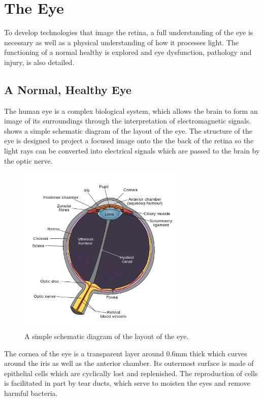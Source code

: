 
\chapter{The Eye}

\label{anatomy}

To develop technologies that image the retina, a full understanding
of the eye is necessary as well as a physical understanding of how it
processes light. The functioning of a normal healthy is explored and eye
dysfunction, pathology and injury, is also detailed.

\section{A Normal, Healthy Eye}

The human eye is a complex biological system, which allows the brain to
form an image of its surroundings through the interpretation of
electromagnetic signals.  shows a simple schematic
diagram of the layout of the eye. The structure of the eye is designed to
project a focused image onto the the back of the retina so the light rays
can be converted into electrical signals which are passed to the brain by
the optic nerve.

\begin{figure}[H]
\centering
  \includegraphics[width=8cm]{figures/schematic_diagram_of_the_human_eye}
\caption{A simple schematic diagram of the layout of the eye.\cite{wikiRhcastilhos}}
\label{fig:eye_simple}
\end{figure}

The cornea of the eye is a transparent layer around 0.6mm thick
which curves around the iris as well as the anterior
chamber.\cite{yaylali1997corneal,thoft1983x,patel1994refractive}
Its outermost surface is made of epithelial cells which are cyclically lost
and replenished.\cite{jester1999cellular,hassell2010molecular} The
reproduction of cells is facilitated in part by tear ducts, which serve
to moisten the eyes and remove harmful bacteria.\cite{holly1977tear}

